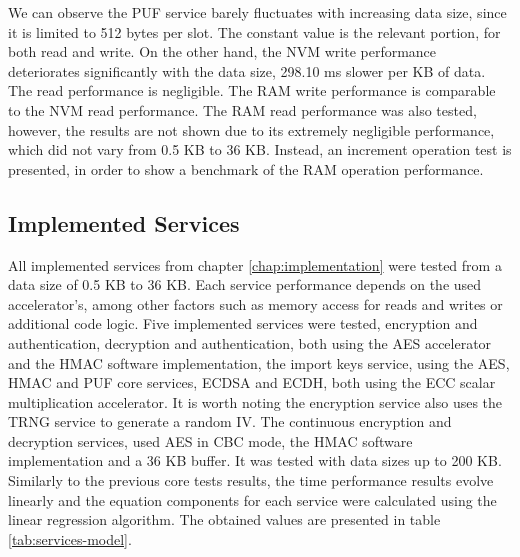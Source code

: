 

We can observe the PUF service barely fluctuates with increasing data size, since it is limited to 512 bytes per slot. The constant value is the relevant portion, for both read and write.
On the other hand, the NVM write performance deteriorates significantly with the data size, 298.10 ms slower per KB of data. The read performance is negligible.
The RAM write performance is comparable to the NVM read performance. The RAM read performance was also tested, however, the results are not shown due to its extremely negligible performance, which did not vary from 0.5 KB to 36 KB. Instead, an increment operation test is presented, in order to show a benchmark of the RAM operation performance.

\subsection{Implemented Services}\label{chap:evaluation:services}

All implemented services from chapter \ref{chap:implementation} were tested from a data size of 0.5 KB to 36 KB. Each service performance depends on the used accelerator's, among other factors such as memory access for reads and writes or additional code logic.
Five implemented services were tested, encryption and authentication, decryption and authentication, both using the \ac{AES} accelerator and the \ac{HMAC} software implementation, the import keys service, using the \ac{AES}, \ac{HMAC} and \ac{PUF} core services, \ac{ECDSA} and \ac{ECDH}, both using the \ac{ECC} scalar multiplication accelerator. It is worth noting the encryption service also uses the \ac{TRNG} service to generate a random \ac{IV}. The continuous encryption and decryption services, used AES in CBC mode, the HMAC software implementation and a 36 KB buffer. It was tested with data sizes up to 200 KB.
Similarly to the previous core tests results, the time performance results evolve linearly and the equation components for each service were calculated using the linear regression algorithm. The obtained values are presented in table \ref{tab:services-model}.



